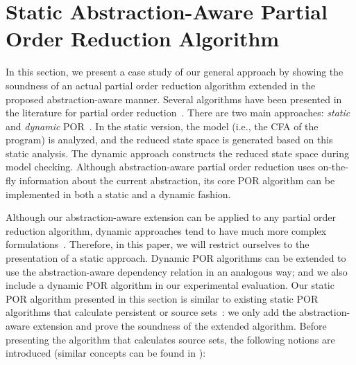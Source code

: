 \documentclass[numbook]{svjour3}
\begin{document}

\section{Static Abstraction-Aware Partial Order Reduction Algorithm}
\label{sec:aaspor}

In this section, we present a case study of our general approach by showing the soundness of an actual partial order reduction algorithm extended in the proposed abstraction-aware manner. Several algorithms have been presented in the literature for partial order reduction~\cite{godefroid-thesis,dpor,optimal_dpor}. There are two main approaches: \emph{static} and \emph{dynamic} POR~\cite{principles-of-model-checking}. In the static version, the model (i.e., the CFA of the program) is analyzed, and the reduced state space is generated based on this static analysis. The dynamic approach constructs the reduced state space during model checking. Although abstraction-aware partial order reduction uses on-the-fly information about the current abstraction, its core POR algorithm can be implemented in both a static and a dynamic fashion.

Although our abstraction-aware extension can be applied to any partial order reduction algorithm, dynamic approaches tend to have much more complex formulations~\cite{source_persistent, optimal_dpor}. Therefore, in this paper, we will restrict ourselves to the presentation of a static approach. Dynamic POR algorithms can be extended to use the abstraction-aware dependency relation in an analogous way; and we also include a dynamic POR algorithm in our experimental evaluation. Our static POR algorithm presented in this section is similar to existing static POR algorithms that calculate persistent or source sets~\cite{source_persistent,overman,godefroid-thesis}: we only add the abstraction-aware extension and prove the soundness of the extended algorithm. Before presenting the algorithm that calculates source sets, the following notions are introduced (similar concepts can be found in \cite{source_persistent}):
\end{document}
